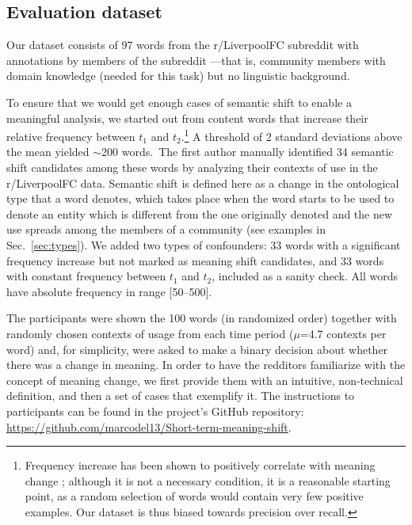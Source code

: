 

\subsection{Evaluation dataset}
\label{subsec:Evaluation dataset}

Our dataset consists of 97 words from the r/LiverpoolFC subreddit with
annotations by members of the subreddit ---that is, community members
with domain knowledge (needed for this task) but no linguistic
background.

To ensure that we would get enough cases of semantic shift to enable a
meaningful analysis, we started out from content words that increase
their relative frequency between $t_1$ and $t_2$.\footnote{Frequency
  increase has been shown to positively correlate with meaning change
  \cite{wijaya2011understanding,kulkarni2015statistically}; although
  it is not a necessary condition, it is a reasonable starting point,
  as a random selection of words would contain very few positive
  examples. Our dataset is thus biased towards precision over recall.}
A threshold of 2 standard deviations above the mean yielded
$\sim$200 words.~The first author manually identified 34 semantic
shift candidates among these words by analyzing their contexts of use
in the r/LiverpoolFC data.  Semantic shift is defined here as a change
in the ontological type that a word denotes, which takes place when the word starts to be used to denote an entity which is different from the one originally denoted and the new use spreads among the members of a community (see examples in Sec.~\ref{sec:types}).
We added two types of confounders: 33 words
with a significant frequency increase but not marked as meaning
shift candidates, and 33 words with constant frequency between $t_1$
and $t_2$, included as a sanity check. All words have
  absolute frequency in range [50--500].

The participants were shown the 100 words (in randomized order)
together with randomly chosen contexts of usage from each time period
($\mu$=4.7 contexts per word) and, for simplicity, were asked to make
a binary decision about whether there was a change in meaning. In order to have the redditors familiarize with the concept of meaning change, we first provide them with an intuitive, non-technical definition, and then a set of cases that exemplify it. The instructions to participants can be found in the project's GitHub repository: \url{https://github.com/marcodel13/Short-term-meaning-shift}.

